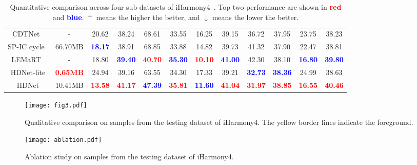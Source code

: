 \documentclass[sigconf]{acmart}
\begin{document}
\begin{table*}[t]
{\begin{tabular}{cccccccccccc}
			CDTNet~\cite{CDTNet} &-&20.62 &38.24&68.61&33.55 &16.25 & 39.15&36.72& 37.95 & 23.75 & 38.23\\
			SP-IC cycle~\cite{cai2023structure}& 66.70MB & \textbf{\textcolor{blue}{18.17}} & 38.91 & 68.85 &33.88&14.82& 39.73&41.32& 37.90&22.47&38.81  \\
			LEMaRT~\cite{liu2023lemart}& - & 18.80 &\textbf{\textcolor{blue}{39.40}} & \textbf{\textcolor{red}{40.70}} &\textbf{\textcolor{blue}{35.30}} &\textbf{\textcolor{red}{10.10}}& \textbf{\textcolor{blue}{41.00}} & 42.30& 38.10& \textbf{\textcolor{blue}{16.80}} &\textbf{\textcolor{blue}{39.80}}  \\
			\midrule
			HDNet-lite &\textbf{\textcolor{red}{0.65MB}}&24.94 & 39.16 & 63.55& 34.30 & 17.33 &39.21 & \textbf{\textcolor{blue}{32.73}} & \textbf{\textcolor{blue}{38.36}} &24.99& 38.63\\
			HDNet&10.41MB&\textbf{\textcolor{red}{13.58}}&\textbf{\textcolor{red}{41.17}} & \textbf{\textcolor{blue}{47.39}} & \textbf{\textcolor{red}{35.81}} & 
			\textbf{\textcolor{blue}{11.60}} & \textbf{\textcolor{red}{41.04}} & \textbf{\textcolor{red}{31.97}} & \textbf{\textcolor{red}{38.85}} & \textbf{\textcolor{red}{16.55}} & \textbf{\textcolor{red}{40.46}} \\
			\bottomrule
	\end{tabular}}
	\caption{Quantitative comparison across four sub-datasets of iHarmony4~\cite{DoveNet}. Top two performance are shown in \textbf{\textcolor{red}{red}} and \textbf{\textcolor{blue}{blue}}. $\uparrow$ means the higher the better, and $\downarrow$ means the lower the better.}
	\label{tab:my_label}
\end{table*}


\begin{figure*}[t]
	\centering
	\texttt{[image: fig3.pdf]}
	\caption{Qualitative comparison on samples from the testing dataset of iHarmony4. The yellow border lines indicate the foreground.}
	\label{fig3}
\end{figure*}


\begin{figure*}[t]
	\centering
	\texttt{[image: ablation.pdf]}
	\caption{Ablation study on samples from the testing dataset of iHarmony4.}
	\label{fig3}
\end{figure*}
\end{document}
